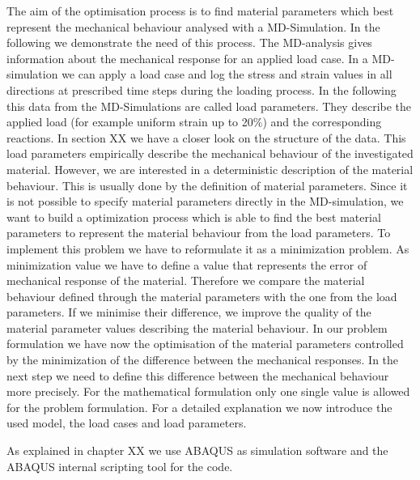     The aim of the optimisation process is to find material parameters which best represent the mechanical behaviour analysed with a MD-Simulation. In the following we demonstrate the need of this process.
    The MD-analysis gives information about the mechanical response for an applied load case. In a MD-simulation we can apply a load case and log the stress and strain values in all directions at prescribed time steps during the loading process. In the following this data from the MD-Simulations are called load parameters. They describe the applied load (for example uniform strain up to 20\(\%\)) and the corresponding reactions. In section XX we have a closer look on the structure of the data. 
    This load parameters empirically describe the mechanical behaviour of the investigated material. However, we are interested in a deterministic description of the material behaviour. This is usually done by the definition of material parameters. Since it is not possible to specify material parameters directly in the MD-simulation, we want to build a optimization process which is able to find the best material parameters to represent the material behaviour from the load parameters. To implement this problem we have to reformulate it as a minimization problem. As minimization value we have to define a value that represents the error of mechanical response of the material. Therefore we compare the material behaviour defined through the material parameters with the one from the load parameters. If we minimise their difference, we improve the quality of the material parameter values describing the material behaviour. In our problem formulation we have now the optimisation of the material parameters controlled by the minimization of the difference between the mechanical responses. In the next step we need to define this difference between the mechanical behaviour more precisely. For the mathematical formulation only one single value is allowed for the problem formulation. For a detailed explanation we now introduce the used model, the load cases and load parameters.

    As explained in chapter XX we use ABAQUS as simulation software and the ABAQUS internal scripting tool for the code. 
    
    

